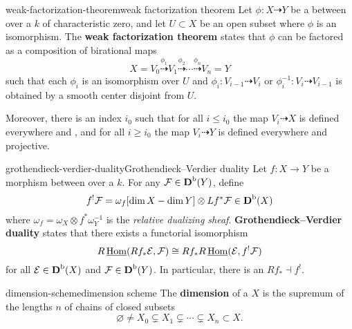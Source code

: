 \begin{topic}{weak-factorization-theorem}{weak factorization theorem}
    Let $\phi : X \dashrightarrow Y$ be a  between     over a  $k$ of characteristic zero, and let $U \subset X$ be an open subset where $\phi$ is an isomorphism.
    The \textbf{weak factorization theorem} states that $\phi$ can be factored as a composition of birational maps
    \[ X = V_0 \overset{\phi_1}{\dashrightarrow} V_1 \overset{\phi_2}{\dashrightarrow} \cdots \overset{\phi_n}{\dashrightarrow} V_n = Y \]
    such that each $\phi_i$ is an isomorphism over $U$ and $\phi_i : V_{i - 1} \dashrightarrow V_i$ or $\phi_i^{-1} : V_i \dashrightarrow V_{i - 1}$ is obtained by  a smooth center disjoint from $U$.
    
    Moreover, there is an index $i_0$ such that for all $i \le i_0$ the map $V_i \dashrightarrow X$ is defined everywhere and , and for all $i \ge i_0$ the map $V_i \dashrightarrow Y$ is defined everywhere and projective.
\end{topic}

\begin{topic}{grothendieck-verdier-duality}{Grothendieck--Verdier duality}
    Let $f : X \to Y$ be a morphism between   over a  $k$. For any $\mathcal{F} \in \textbf{D}^\textup{b}(Y)$, define
    \[ f^! \mathcal{F} = \omega_f[\dim X - \dim Y] \otimes L f^* \mathcal{F} \in \textbf{D}^\textup{b}(X) \]
    where $\omega_f = \omega_X \otimes f^* \omega_Y^{-1}$ is the \textit{relative dualizing sheaf}.
    \textbf{Grothendieck--Verdier duality} states that there exists a functorial isomorphism
    \[ R \operatorname{\underline{Hom}}(R f_* \mathcal{E}, \mathcal{F}) \cong R f_* R \operatorname{\underline{Hom}}(\mathcal{E}, f^! \mathcal{F}) \]
    for all $\mathcal{E} \in \textbf{D}^\textup{b}(X)$ and $\mathcal{F} \in \textbf{D}^\textup{b}(Y)$. In particular, there is an  $R f_* \dashv f^!$.
\end{topic}

\begin{topic}{dimension-scheme}{dimension scheme}
    The \textbf{dimension} of a  $X$ is the supremum of the lengths $n$ of chains of  closed subsets
    \[ \varnothing \ne X_0 \subsetneq X_1 \subsetneq \cdots \subsetneq X_n \subset X . \]
\end{topic}

